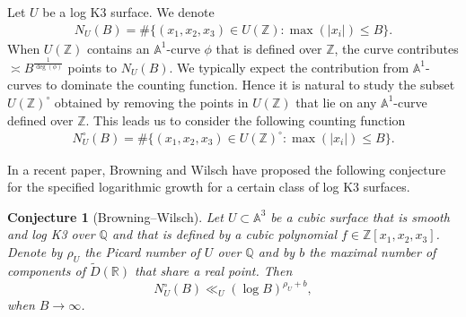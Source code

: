 \documentclass[reqno, 11pt, twoside]{amsart}
\numberwithin{equation}{section}
\newtheorem{conj}[theorem]{Conjecture}
\theoremstyle{definition}
\renewcommand{\leq}{\leqslant}
\newcommand{\PP}{\mathbb{P}}
\newcommand{\RR}{\mathbb{R}}
\newcommand{\AAA}{\mathbb{A}}
\newcommand{\QQ}{\mathbb{Q}}
\newcommand{\ZZ}{\mathbb{Z}}
\begin{document}

Let $U$ be a log K3 surface. We denote
\begin{eqnarray*}
	N_U(B) = \# \{ (x_1, x_2, x_3) \in U(\ZZ): \max(|x_i|) \leq B \}.
\end{eqnarray*}
When $U(\ZZ)$ contains an $\AAA^1$-curve $\phi$ that is defined over $\ZZ$, the curve contributes $\asymp B^{\frac{1}{\deg(\phi)}}$ points to $N_U(B)$. We typically expect the contribution from $\AAA^1$-curves to dominate the counting function. Hence it is natural to study the subset $U(\ZZ)^\circ$ obtained by removing the points in $U(\ZZ)$ that lie on any $\AAA^1$-curve defined over $\ZZ$. This leads us to consider the following counting function
\begin{eqnarray*}
	N_U^\circ(B) = \# \{ (x_1, x_2, x_3) \in U(\ZZ)^\circ: \max(|x_i|) \leq B \}.
\end{eqnarray*}

In a recent paper, Browning and Wilsch \cite[Conjecture 1.1]{BroWil} have proposed the following conjecture for the specified logarithmic growth  for a certain class of log K3 surfaces.
\begin{conj}[Browning--Wilsch]\label{BW-h}
	Let $U \subset \AAA^3$ be a cubic surface that is smooth and log K3 over $\QQ$ and that is defined by a cubic polynomial $f \in \ZZ[x_1, x_2, x_3]$. Denote by $\rho_U$ the Picard number of $U$ over $\QQ$ and by $b$ the maximal number of components of $\tilde{D}(\RR)$ that share a real point. Then
	$$N_U^\circ(B) \ll_U (\log B)^{\rho_U + b},$$
	when $B \rightarrow \infty$.
\end{conj}



\end{document}
